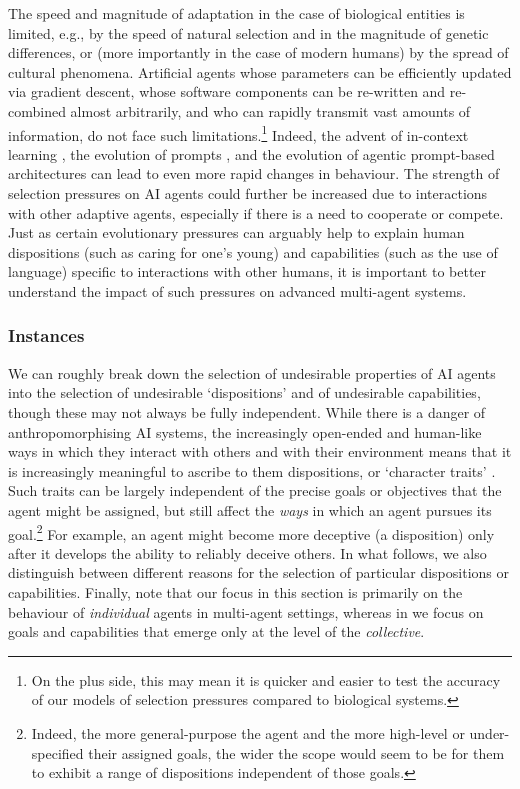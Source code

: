 The speed and magnitude of adaptation in the case of biological entities is limited, e.g., by the speed of natural selection and in the magnitude of genetic differences, or (more importantly in the case of modern humans) by the spread of cultural phenomena.
Artificial agents whose parameters can be efficiently updated via gradient descent, 
whose software components can be re-written and re-combined almost arbitrarily, 
and who can rapidly transmit vast amounts of information, do not face such limitations.\footnote{On the plus side, this may mean it is quicker and easier to test the accuracy of our models of selection pressures compared to biological systems.}
Indeed, the advent of in-context learning \citep{Brown2020}, the evolution of prompts \citep{Fernando2023}, and the evolution of agentic prompt-based architectures \citep{Hu2024} can lead to even more rapid changes in behaviour.
The strength of selection pressures on AI agents could further be increased due to interactions with other adaptive agents, especially if there is a need to cooperate or compete.
Just as certain evolutionary pressures can arguably help to explain human dispositions (such as caring for one's young) and capabilities (such as the use of language) specific to interactions with other humans, it is important to better understand the impact of such pressures on advanced multi-agent systems.

\subsubsection{Instances} 


We can roughly break down the selection of undesirable properties of AI agents into the selection of undesirable `dispositions' and of undesirable capabilities, though these may not always be fully independent.
While there is a danger of anthropomorphising AI systems, the increasingly open-ended and human-like ways in which they interact with others and with their environment means that it is increasingly meaningful to ascribe to them dispositions, or `character traits' \citep{serapio-garciaPersonalityTraitsLarge2023,wang2024large}.
Such traits can be largely independent of the precise goals or objectives that the agent 
might be assigned, but still affect the \textit{ways} in which an agent pursues its goal.\footnote{Indeed, the more general-purpose the agent and the more high-level or 
under-specified their assigned goals, the wider the scope would seem to be for them to exhibit a range of dispositions independent of those goals.}
For example, an agent might become more deceptive (a disposition) 
only after it develops the ability to reliably deceive others. 
In what follows, we also distinguish between different reasons for the selection of particular dispositions or capabilities. 
Finally, note that our focus in this section is primarily on the behaviour of \textit{individual} agents in multi-agent settings, whereas in  we focus on goals and capabilities that emerge only at the level of the \textit{collective}.

